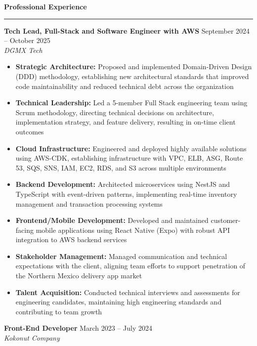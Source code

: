 \documentclass[10pt]{article}
\renewcommand{\section}[1]{%
    \vspace{6pt}
    {\large\bfseries #1}
    \vspace{2pt}
    \hrule
    \vspace{4pt}
}
\newcommand{\entry}[4]{%
    \textbf{#1} \hfill #2\\
    \textit{#3} \hfill #4\\
    \vspace{2pt}
}
\begin{document}
\section{Professional Experience}

\entry{Tech Lead, Full-Stack and Software Engineer with AWS}{September 2024 -- October 2025}{DGMX Tech}{}

\begin{itemize}[leftmargin=*]
    \item \textbf{Strategic Architecture:} Proposed and implemented Domain-Driven Design (DDD) methodology, establishing new architectural standards that improved code maintainability and reduced technical debt across the organization
    \item \textbf{Technical Leadership:} Led a 5-member Full Stack engineering team using Scrum methodology, directing technical decisions on architecture, implementation strategy, and feature delivery, resulting in on-time client outcomes
    \item \textbf{Cloud Infrastructure:} Engineered and deployed highly available solutions using AWS-CDK, establishing infrastructure with VPC, ELB, ASG, Route 53, SQS, SNS, IAM, EC2, RDS, and S3 across multiple environments
    \item \textbf{Backend Development:} Architected microservices using NestJS and TypeScript with event-driven patterns, implementing real-time inventory management and transaction processing systems
    \item \textbf{Frontend/Mobile Development:} Developed and maintained customer-facing mobile applications using React Native (Expo) with robust API integration to AWS backend services
    \item \textbf{Stakeholder Management:} Managed communication and technical expectations with the client, aligning team efforts to support penetration of the Northern Mexico delivery app market
    \item \textbf{Talent Acquisition:} Conducted technical interviews and assessments for engineering candidates, maintaining high engineering standards and contributing to team growth
\end{itemize}

\entry{Front-End Developer}{March 2023 -- July 2024}{Kokonut Company}{}
\end{document}
